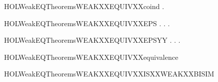 \begin{SaveVerbatim}{HOLWeakEQTheoremsWEAKXXEQUIVXXcoind}
       \HOLSymConst{\HOLTokenForall{}} .    \HOLSymConst{\HOLTokenImp{}}   
\end{SaveVerbatim}
\newcommand{\HOLWeakEQTheoremsWEAKXXEQUIVXXcoind}{\UseVerbatim{HOLWeakEQTheoremsWEAKXXEQUIVXXcoind}}
\begin{SaveVerbatim}{HOLWeakEQTheoremsWEAKXXEQUIVXXEPS}
\HOLTokenTurnstile{} \HOLSymConst{\HOLTokenForall{}} .
          \HOLSymConst{\HOLTokenImp{}}
       \HOLSymConst{\HOLTokenForall{}}.    \HOLSymConst{\HOLTokenImp{}} \HOLSymConst{\HOLTokenExists{}}.    \HOLSymConst{\HOLTokenConj{}}   
\end{SaveVerbatim}
\newcommand{\HOLWeakEQTheoremsWEAKXXEQUIVXXEPS}{\UseVerbatim{HOLWeakEQTheoremsWEAKXXEQUIVXXEPS}}
\begin{SaveVerbatim}{HOLWeakEQTheoremsWEAKXXEQUIVXXEPSYY}
\HOLTokenTurnstile{} \HOLSymConst{\HOLTokenForall{}} .
          \HOLSymConst{\HOLTokenImp{}}
       \HOLSymConst{\HOLTokenForall{}}.    \HOLSymConst{\HOLTokenImp{}} \HOLSymConst{\HOLTokenExists{}}.    \HOLSymConst{\HOLTokenConj{}}   
\end{SaveVerbatim}
\newcommand{\HOLWeakEQTheoremsWEAKXXEQUIVXXEPSYY}{\UseVerbatim{HOLWeakEQTheoremsWEAKXXEQUIVXXEPSYY}}
\begin{SaveVerbatim}{HOLWeakEQTheoremsWEAKXXEQUIVXXequivalence}
\HOLTokenTurnstile{}  
\end{SaveVerbatim}
\newcommand{\HOLWeakEQTheoremsWEAKXXEQUIVXXequivalence}{\UseVerbatim{HOLWeakEQTheoremsWEAKXXEQUIVXXequivalence}}
\begin{SaveVerbatim}{HOLWeakEQTheoremsWEAKXXEQUIVXXISXXWEAKXXBISIM}
\HOLTokenTurnstile{}  
\end{SaveVerbatim}
